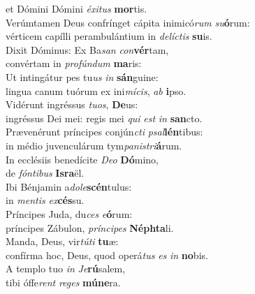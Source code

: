 \evenverse et Dómini Dómini \textit{é}\textit{xi}\textit{tus} \textbf{mor}tis.\\
\oddverse Verúmtamen Deus confrínget cápita inimicó\textit{rum} \textit{su}\textbf{ó}rum:~\*\\
\oddverse vérticem capílli perambulántium in \textit{de}\textit{lí}\textit{ctis} \textbf{su}is.\\
\evenverse Dixit Dóminus: Ex Ba\textit{san} \textit{con}\textbf{vér}tam,~\*\\
\evenverse convértam in \textit{pro}\textit{fún}\textit{dum} \textbf{ma}ris:\\
\oddverse Ut intingátur pes tu\textit{us} \textit{in} \textbf{sán}guine:~\*\\
\oddverse lingua canum tuórum ex ini\textit{mí}\textit{cis}, \textit{ab} \textbf{i}pso.\\
\evenverse Vidérunt ingréssus \textit{tu}\textit{os}, \textbf{De}us:~\*\\
\evenverse ingréssus Dei mei: regis mei \textit{qui} \textit{est} \textit{in} \textbf{san}cto.\\
\oddverse Prævenérunt príncipes conjún\textit{cti} \textit{psal}\textbf{lén}tibus:~\*\\
\oddverse in médio juvenculárum tym\textit{pa}\textit{ni}\textit{stri}\textbf{á}rum.\\
\evenverse In ecclésiis benedícite \textit{De}\textit{o} \textbf{Dó}mino,~\*\\
\evenverse de \textit{fón}\textit{ti}\textit{bus} \textbf{Is}\textbf{ra}ël.\\
\oddverse Ibi Bénjamin a\textit{do}\textit{le}\textbf{scén}tulus:~\*\\
\oddverse in \textit{men}\textit{tis} \textit{ex}\textbf{cés}su.\\
\evenverse Príncipes Juda, du\textit{ces} \textit{e}\textbf{ó}rum:~\*\\
\evenverse príncipes Zábulon, \textit{prín}\textit{ci}\textit{pes} \textbf{Né}\textbf{phta}li.\\
\oddverse Manda, Deus, vir\textit{tú}\textit{ti} \textbf{tu}æ:~\*\\
\oddverse confírma hoc, Deus, quod operá\textit{tus} \textit{es} \textit{in} \textbf{no}bis.\\
\evenverse A templo tuo \textit{in} \textit{Je}\textbf{rú}salem,~\*\\
\evenverse tibi óffe\textit{rent} \textit{re}\textit{ges} \textbf{mú}\textbf{ne}ra.\\
